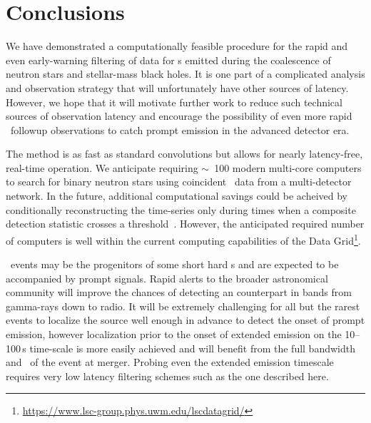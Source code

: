 \section{Conclusions}
\label{sec:conclusions}

We have demonstrated a computationally feasible procedure for the rapid and
even early-warning filtering of data for \GW{}s emitted during the coalescence
of neutron stars and stellar-mass black holes.  It is one part of a complicated
analysis and observation strategy that will unfortunately have other sources of
latency.  However, we hope that it will motivate further work to reduce such
technical sources of \GW{} observation latency and encourage the possibility of
even more rapid \EM\ followup observations to catch prompt emission in the
advanced detector era.  

The \lloid{} method is as fast as standard \fft{} convolutions but allows for
nearly latency-free, real-time operation.  We anticipate requiring $\sim$~100
modern multi-core computers to search for binary neutron stars using
coincident \GW\ data from a multi-detector network.  In the future, additional
computational savings could be acheived by conditionally reconstructing the
\SNR{} time-series only during times when a composite detection statistic
crosses a threshold~\citep{svd-compdetstat}.  However, the anticipated required
number of computers is well within the current computing capabilities of the
\LIGO{} Data
Grid\footnote{\url{https://www.lsc-group.phys.uwm.edu/lscdatagrid/}}.

\CBC\ events may be the progenitors of some short hard \GRB{}s and are expected
to be accompanied by prompt \EM{} signals.  Rapid alerts to the broader
astronomical community will improve the chances of detecting an \EM{}
counterpart in bands from gamma-rays down to radio.  It will be extremely
challenging for all but the rarest events to localize the source well enough in
advance to detect the onset of prompt emission, however localization prior to
the onset of extended emission on the 10--100\,s time-scale is more easily
achieved and will benefit from the full bandwidth and \SNR\ of the \GW{} event
at merger.  Probing even the extended emission timescale requires very low
latency filtering schemes such as the one described here.

\begin{comment}
The detection algorithm we described has no intrinsic latency.  However, there
are fundamental and practical latencies associated with the analysis and
detection procedure. For example, the \LIGO{} data acquisition records science
data in 1/16~s blocks~\citep{Bork2001}. Data must also be aggregated from all
of the \GW\ observatories using global computer networks capable of high
bandwidth but perhaps only modest latency.  This could introduce a latency of
$\sim$100~ms.  Lastly, the software implementation of the algorithm itself may
introduce latency.  
\end{comment}


